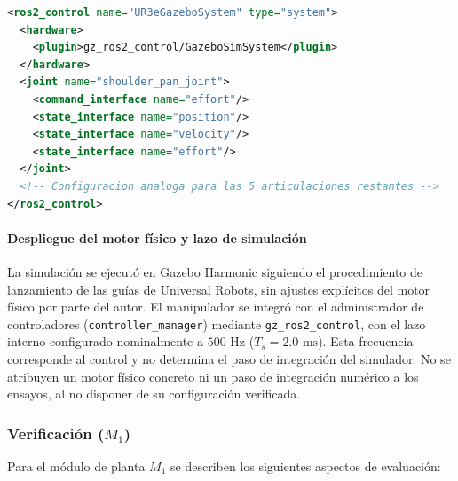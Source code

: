 \documentclass[12pt]{article}
\begin{document}
\begin{lstlisting}[language=XML, caption={Configuración de interfaces de esfuerzo y estado en ros2\_control para Gazebo Harmonic.}, label={lst:urdf_control_m1}]
<ros2_control name="UR3eGazeboSystem" type="system">
  <hardware>
    <plugin>gz_ros2_control/GazeboSimSystem</plugin>
  </hardware>
  <joint name="shoulder_pan_joint">
    <command_interface name="effort"/>
    <state_interface name="position"/>
    <state_interface name="velocity"/>
    <state_interface name="effort"/>
  </joint>
  <!-- Configuracion analoga para las 5 articulaciones restantes -->
</ros2_control>
\end{lstlisting}

\paragraph{Despliegue del motor físico y lazo de simulación}
La simulación se ejecutó en Gazebo Harmonic siguiendo el procedimiento de lanzamiento de las guías de Universal Robots, sin ajustes explícitos del motor físico por parte del autor. El manipulador se integró con el administrador de controladores (\texttt{controller\_manager}) mediante \texttt{gz\_ros2\_control}, con el lazo interno configurado nominalmente a $500\text{ Hz}$ ($T_s = 2.0\text{ ms}$). Esta frecuencia corresponde al control y no determina el paso de integración del simulador. No se atribuyen un motor físico concreto ni un paso de integración numérico a los ensayos, al no disponer de su configuración verificada.

\subsubsection{Verificación ($M_1$)}
\label{sec:ver_m1}

Para el módulo de planta $M_1$ se describen los siguientes aspectos de evaluación:
\end{document}
